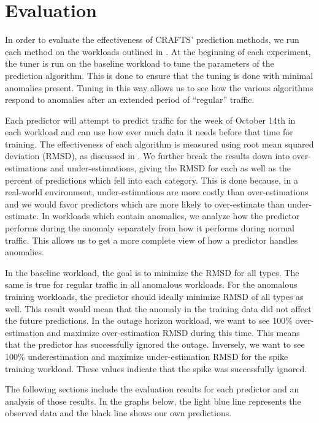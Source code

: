 \chapter{Evaluation}
In order to evaluate the effectiveness of CRAFTS' prediction methods, we run each method on the workloads outlined in . At the beginning of each experiment, the tuner is run on the baseline workload to tune the parameters of the prediction algorithm. This is done to ensure that the tuning is done with minimal anomalies present. Tuning in this way allows us to see how the various algorithms respond to anomalies after an extended period of ``regular'' traffic.

Each predictor will attempt to predict traffic for the week of October 14th in each workload and can use how ever much data it needs before that time for training. The effectiveness of each algorithm is measured using root mean squared deviation (RMSD), as discussed in . We further break the results down into over-estimations and under-estimations, giving the RMSD for each as well as the percent of predictions which fell into each category. This is done because, in a real-world environment, under-estimations are more costly than over-estimations and we would favor predictors which are more likely to over-estimate than under-estimate. In workloads which contain anomalies, we analyze how the predictor performs during the anomaly separately from how it performs during normal traffic. This allows us to get a more complete view of how a predictor handles anomalies.

In the baseline workload, the goal is to minimize the RMSD for all types. The same is true for regular traffic in all anomalous workloads. For the anomalous training workloads, the predictor should ideally minimize RMSD of all types as well. This result would mean that the anomaly in the training data did not affect the future predictions. In the outage horizon workload, we want to see 100\% over-estimation and maximize over-estimation RMSD during this time. This means that the predictor has successfully ignored the outage. Inversely, we want to see 100\% underestimation and maximize under-estimation RMSD for the spike training workload. These values indicate that the spike was successfully ignored.

The following sections include the evaluation results for each predictor and an analysis of those results. In the graphs below, the light blue line represents the observed data and the black line shows our own predictions.

